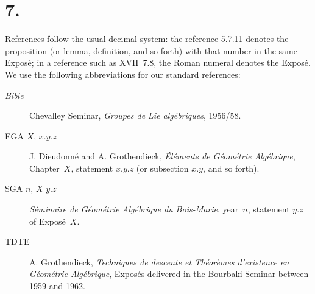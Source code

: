 \section*{7.}

References follow the usual decimal system: the reference 5.7.11 denotes the
proposition (or lemma, definition, and so forth) with that number in the same
Expos\'e; in a reference such as XVII~7.8, the Roman numeral denotes the Expos\'e.
We use the following abbreviations for our standard references:

\begin{description}
\item[\emph{Bible}] Chevalley Seminar, \emph{Groupes de Lie alg\'ebriques},
  1956/58.
\item[EGA $X$, $x.y.z$] J. Dieudonn\'e and A. Grothendieck,
  \emph{\'El\'ements de G\'eom\'etrie Alg\'ebrique}, Chapter~$X$, statement
  $x.y.z$ (or subsection $x.y$, and so forth).
\item[SGA $n$, $X$ $y.z$] \emph{S\'eminaire de G\'eom\'etrie Alg\'ebrique du
  Bois-Marie}, year~$n$, statement $y.z$ of Expos\'e~$X$.
\item[TDTE] A. Grothendieck, \emph{Techniques de descente et Th\'eor\`emes
  d'existence en G\'eom\'etrie Alg\'ebrique}, Expos\'es delivered in the Bourbaki
  Seminar between 1959 and 1962.
\end{description}

\endgroup
